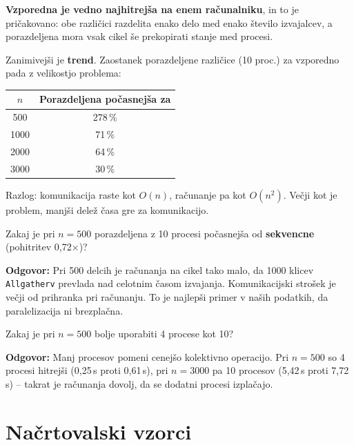 \documentclass[12pt,a4paper]{article}
\begin{document}
\begin{kljucno}
\textbf{Vzporedna je vedno najhitrej\v{s}a na enem ra\v{c}unalniku}, in to je pri\v{c}akovano: obe razli\v{c}ici razdelita enako delo med enako \v{s}tevilo izvajalcev, a porazdeljena mora vsak cikel \v{s}e prekopirati stanje med procesi.

Zanimivej\v{s}i je \textbf{trend}. Zaostanek porazdeljene razli\v{c}ice (10 proc.) za vzporedno pada z velikostjo problema:
\begin{center}
\begin{tabular}{|c|c|}
\hline
$n$ & Porazdeljena po\v{c}asnej\v{s}a za \\
\hline
500  & 278\,\% \\
1000 & 71\,\% \\
2000 & 64\,\% \\
3000 & 30\,\% \\
\hline
\end{tabular}
\end{center}
Razlog: komunikacija raste kot $O(n)$, ra\v{c}unanje pa kot $O(n^2)$. Ve\v{c}ji kot je problem, manj\v{s}i dele\v{z} \v{c}asa gre za komunikacijo.
\end{kljucno}

\begin{vprasanje}
Zakaj je pri $n = 500$ porazdeljena z 10 procesi po\v{c}asnej\v{s}a od \textbf{sekvencne} (pohitritev 0{,}72$\times$)?

\textbf{Odgovor:} Pri 500 delcih je ra\v{c}unanja na cikel tako malo, da 1000 klicev \texttt{Allgatherv} prevlada nad celotnim \v{c}asom izvajanja. Komunikacijski stro\v{s}ek je ve\v{c}ji od prihranka pri ra\v{c}unanju. To je najlep\v{s}i primer v na\v{s}ih podatkih, da paralelizacija ni brezpla\v{c}na.
\end{vprasanje}

\begin{vprasanje}
Zakaj je pri $n = 500$ bolje uporabiti 4 procese kot 10?

\textbf{Odgovor:} Manj procesov pomeni cenej\v{s}o kolektivno operacijo. Pri $n = 500$ so 4 procesi hitrej\v{s}i (0{,}25\,s proti 0{,}61\,s), pri $n = 3000$ pa 10 procesov (5{,}42\,s proti 7{,}72\,s) -- takrat je ra\v{c}unanja dovolj, da se dodatni procesi izpla\v{c}ajo.
\end{vprasanje}

\section{Na\v{c}rtovalski vzorci}
\end{document}
